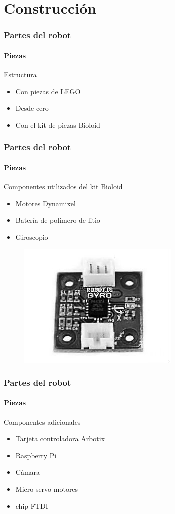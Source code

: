 \documentclass{beamer}
\begin{document}
  

\section{Construcci\'on }
\begin{frame}
  \frametitle{Partes del robot}
  \framesubtitle{Piezas}

\begin{block}{Estructura}
	\begin{itemize}
		\item Con piezas de LEGO
		\item Desde cero
		\item Con el kit de piezas Bioloid
	\end{itemize}
\end{block}

 
\end{frame}

\begin{frame}
 \frametitle{Partes del robot}
 \framesubtitle{Piezas}
 
\begin{block}{Componentes utilizados del kit Bioloid}
\begin{itemize}
\item Motores Dynamixel
\item Bater\'ia de pol\'imero de litio
\item Giroscopio 
\end{itemize}
\end{block}

\begin{figure}[hbtp]
\centering
\includegraphics[scale=0.3]{gyro.jpg} 
\end{figure}

\end{frame}

\begin{frame}
 \frametitle{Partes del robot}
 \framesubtitle{Piezas}
 
\begin{block}{Componentes adicionales}
\begin{itemize}
\item Tarjeta controladora Arbotix
\item Raspberry Pi
\item C\'amara
\item Micro servo motores 
\item chip FTDI
\end{itemize}
\end{block}
\end{frame}
\end{document}
